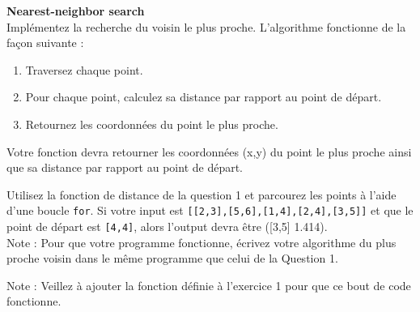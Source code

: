 \begin{Exercice}[10 minutes]\textbf{Nearest-neighbor search}\\

Implémentez la recherche du voisin le plus proche. L'algorithme fonctionne de la façon suivante :
\begin{enumerate}
    \item Traversez chaque point.
    \item Pour chaque point, calculez sa distance par rapport au point de départ.
    \item Retournez les coordonnées du point le plus proche.
\end{enumerate}
Votre fonction devra retourner les coordonnées (x,y) du point le plus proche ainsi que sa distance par rapport au point de départ.
    
\begin{conseil}
    Utilisez la fonction de distance de la question 1 et parcourez les points à l'aide d'une boucle \lstinline{for}. Si votre input est \lstinline{[[2,3],[5,6],[1,4],[2,4],[3,5]]} et que le point de départ est \lstinline{[4,4]}, alors l'output devra être ([3,5] 1.414).\\
    
    Note : Pour que votre programme fonctionne, écrivez votre algorithme du plus proche voisin dans le même programme que celui de la Question 1.
\end{conseil}
\begin{solution}
    Note : Veillez à ajouter la fonction définie à l'exercice 1 pour que ce bout de code fonctionne.
    
\end{solution}
\end{Exercice}

